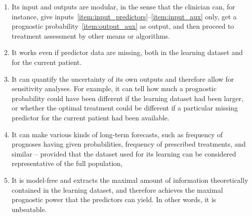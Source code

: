 \documentclass[utf8]{FrontiersinHarvard} %
\renewcommand*{\|}[1][]{\nonscript\:#1\vert\nonscript\:\mathopen{}}
\begin{document}
\begin{enumerate}
\item\label{item:feat_modular_inout} Its input and outputs are modular, in the sense that the clinician can, for instance, give inputs~\ref{item:input_predictors}--\ref{item:input_aux} only, get a prognostic probability~\ref{item:output_aux} as output, and then proceed to treatment assessment by other means or algorithms.

\item\label{item:feat_imputation} It works even if predictor data are missing, both in the learning dataset and for the current patient.

\item\label{item:feat_uncertainty} It can quantify the uncertainty of its own outputs and therefore allow for sensitivity analyses. For example, it can tell how much a prognostic probability could have been different if the learning dataset had been larger, or whether the optimal treatment could be different if a particular missing predictor for the current patient had been available.

\item\label{item:feat_forecast} It can make various kinds of long-term forecasts, such as frequency of prognoses having given probabilities, frequency of prescribed treatments, and similar -- provided that the dataset used for its learning can be considered representative of the full population,

\item\label{item:feat_unbeatable} It is model-free and extracts the maximal amount of information theoretically contained in the learning dataset, and therefore achieves the maximal prognostic power that the predictors can yield. In other words, it is unbeatable.

\end{enumerate}
\end{document}
